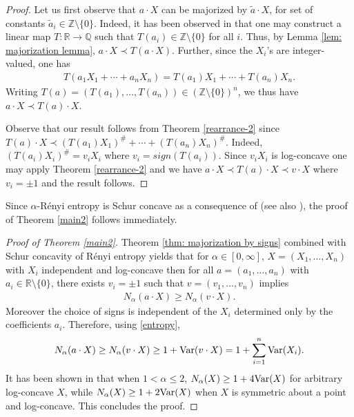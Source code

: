 \documentclass[11pt]{article}
\newcommand{\R}{\mathbb{R}}
\DeclareMathOperator{\Var}{Var}
\newcommand{\1}{[1]}
\def\Var{{\rm Var}}
\begin{document}
\begin{proof}
Let us first observe that $a \cdot X$ can be majorized by $\tilde{a} \cdot X$, for set of constants $\tilde{a}_i \in \mathbb{Z} \setminus \{0\}$. Indeed, it has been observed in \cite[Proof of Lemma 5.1]{MMR} that one may construct a linear map $T \colon \R \to \mathbb{Q}$ such that $T(a_i) \in \mathbb{Z} \setminus \{0\}$ for all $i$. Thus, by Lemma \ref{lem: majorization lemma}, $a \cdot X \prec T( a\cdot X) $. Further, since the $X_i$'s are integer-valued, one has
\begin{align}
T(a_1 X_1 + \cdots + a_n X_n)
    = T(a_1) X_1 + \cdots + T(a_n) X_n.
\end{align}
Writing $T(a) = (T(a_1), \dots, T(a_n)) \in (\mathbb{Z} \setminus \{0\} )^n$, we thus have $a \cdot X \prec T(a) \cdot X$.

Observe that our result follows from Theorem \ref{rearrance-2} since $T(a) \cdot X \prec (T(a_1) X_1)^{\#} + \cdots + (T(a_n) X_n )^{\#}$. Indeed, $(T(a_i) X_i)^{\#} = v_i X_i$ where $v_i = sign(T(a_i))$. Since $v_i X_i$ is log-concave one may apply Theorem \ref{rearrance-2} and we have $a \cdot X \prec T(a) \cdot X \prec v \cdot X$ where $v_i = \pm 1$ and the result follows.
\end{proof}


Since $\alpha$-R\'enyi entropy is Schur concave as a consequence of \cite[Proposition 3-C.1]{MOA} (see also \cite{MWW}),
the proof of Theorem \ref{main2} follows immediately.

\begin{proof}[Proof of Theorem \ref{main2}]
Theorem \ref{thm: majorization by signs} combined with Schur concavity of R\'enyi entropy yields that for $\alpha \in [0,\infty]$, $X = (X_1, \dots, X_n)$ with $X_i$ independent and log-concave  then for all $a = (a_1, \dots, a_n)$ with $a_i \in \mathbb{R} \setminus \{0\}$, there exists $v_i = \pm 1$ such that $v = (v_1, \dots, v_n)$ implies
\begin{align}
N_\alpha( a \cdot X) \geq N_\alpha( v \cdot X).
\end{align}
Moreover the choice of signs is independent of the $X_i$ determined only by the coefficients $a_i$.
Therefore, using \eqref{entropy},
$$ N_\alpha( a \cdot X) \geq N_\alpha( v \cdot X) \geq 1 +\Var(v \cdot X) = 1 + \sum_{i=1}^n \Var(X_i). $$
It has been shown in \cite{BMM} that when $1 < \alpha \leq 2$, $N_{\alpha}(X) \geq 1 + 4\Var(X)$ for arbitrary log-concave $X$, while $N_{\alpha}(X) \geq 1 + 2\Var(X)$ when $X$ is symmetric about a point and log-concave. This concludes the proof.    
\end{proof}
\end{document}
